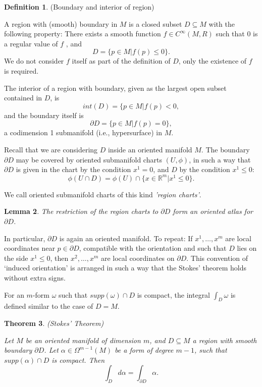 \documentclass{article}
\newtheorem{theorem}{Theorem}[section]
\newtheorem{lemma}[theorem]{Lemma}
\theoremstyle{definition}
\newtheorem{defn}[theorem]{Definition}
\newenvironment{definition}
  {\vspace{8pt}\begin{mdframed}[backgroundcolor=blueish]\begin{defn}}
  {\end{defn}\end{mdframed}\vspace{4pt}}
\begin{document}
\begin{definition} (Boundary and interior of region)

A region with (smooth) boundary in $M$ is a closed subset $D \subseteq M$ with the following property: There exists a smooth function $f \in C^\infty(M,R)$ such that $0$ is a regular value of $f$ , and
\[
    D = \{p \in M | f(p) \leq 0 \}.
\]
We do not consider $f$ itself as part of the definition of $D$, only the existence of $f$ is required. 

The interior of a region with boundary, given as the largest open subset contained in $D$, is 
\[
   int(D) = \{p \in M| f(p) < 0,
\]
and the boundary itself is
\[
   \partial D = \{p \in M| f(p) = 0 \},
\]
a codimension 1 submanifold (i.e., hypersurface) in $M$.

\end{definition}


Recall that we are considering $D$ inside an oriented manifold $M$. The boundary $\partial D$ may be covered by oriented submanifold charts $(U,\phi)$, in such a way that $\partial D$ is given in the chart by the condition $x^1 = 0$, and $D$ by the condition $x^1 \leq 0$:
\[ 
    \phi (U \cap D) = \phi (U) \cap \{x \in \mathbb R^m | x ^1 \leq 0 \}.
\]

We call oriented submanifold charts of this kind \textit{'region charts'}.

\begin{lemma}
The restriction of the region charts to $\partial D$ form an oriented atlas for $\partial D$.
\end{lemma}
In particular, $\partial D$ is again an oriented manifold. To repeat: If $x^1 ,\dots, x^m$ are local coordinates near $p \in \partial D$, compatible with the orientation and such that $D$ lies on the side $x^1 \leq 0$, then $x^2 ,\dots, x^m$ are local coordinates on $\partial D$. This convention of ‘induced orientation’ is arranged in such a way that the Stokes’ theorem holds without extra signs.

For an $m$-form $\omega$ such that $supp(\omega)\cap D$ is compact, the integral $\int_D \omega $ is defined similar to the case of $D = M$.

\begin{theorem} (Stokes' Theorem)


Let $M$ be an oriented manifold of dimension $m$, and $D \subseteq M$ a region with smooth boundary $\partial D$. Let $\alpha \in  \Omega^{m-1} (M)$ be a form of degree $m-1$, such that $supp(\alpha)\cap D$ is compact. Then 
\[
\int_D d\alpha = \int_{\partial D} \alpha.
\]
\end{theorem}
\end{document}
